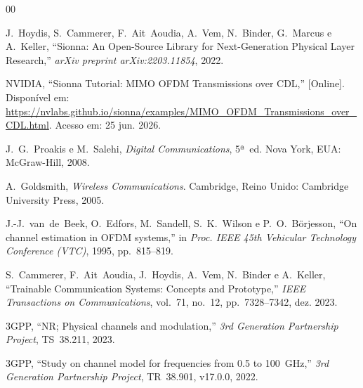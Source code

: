 \documentclass[conference]{IEEEtran}
\begin{document}
\begin{thebibliography}{00}

J.~Hoydis, S.~Cammerer, F.~Ait~Aoudia, A.~Vem, N.~Binder, G.~Marcus e A.~Keller, ``Sionna: An Open-Source Library for Next-Generation Physical Layer Research,'' \textit{arXiv preprint arXiv:2203.11854}, 2022.

NVIDIA, ``Sionna Tutorial: MIMO OFDM Transmissions over CDL,'' [Online]. Disponível em: \url{https://nvlabs.github.io/sionna/examples/MIMO_OFDM_Transmissions_over_CDL.html}. Acesso em: 25 jun. 2026.

J.~G.~Proakis e M.~Salehi, \textit{Digital Communications}, 5ª~ed. Nova York, EUA: McGraw-Hill, 2008.

A.~Goldsmith, \textit{Wireless Communications}. Cambridge, Reino Unido: Cambridge University Press, 2005.

J.-J.~van~de~Beek, O.~Edfors, M.~Sandell, S.~K.~Wilson e P.~O.~Börjesson, ``On channel estimation in OFDM systems,'' in \textit{Proc. IEEE 45th Vehicular Technology Conference (VTC)}, 1995, pp.~815--819.

S.~Cammerer, F.~Ait~Aoudia, J.~Hoydis, A.~Vem, N.~Binder e A.~Keller, ``Trainable Communication Systems: Concepts and Prototype,'' \textit{IEEE Transactions on Communications}, vol.~71, no.~12, pp.~7328--7342, dez. 2023.

3GPP, ``NR; Physical channels and modulation,'' \textit{3rd Generation Partnership Project}, TS~38.211, 2023.

3GPP, ``Study on channel model for frequencies from 0.5 to 100~GHz,'' \textit{3rd Generation Partnership Project}, TR~38.901, v17.0.0, 2022.

\end{thebibliography}
\end{document}

